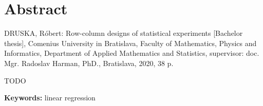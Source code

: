 \thispagestyle{empty}
\section*{Abstract}
DRUSKA, Róbert: Row-column designs of statistical experiments [Bachelor thesis],
Comenius University in Bratislava,
Faculty of Mathematics, Physics and Informatics,
Department of Applied Mathematics and Statistics,
supervisor: doc. Mgr. Radoslav Harman, PhD.,
Bratislava, 2020, 38 p.

TODO

\begin{flushleft}
  \textbf{Keywords:} linear regression
\end{flushleft}